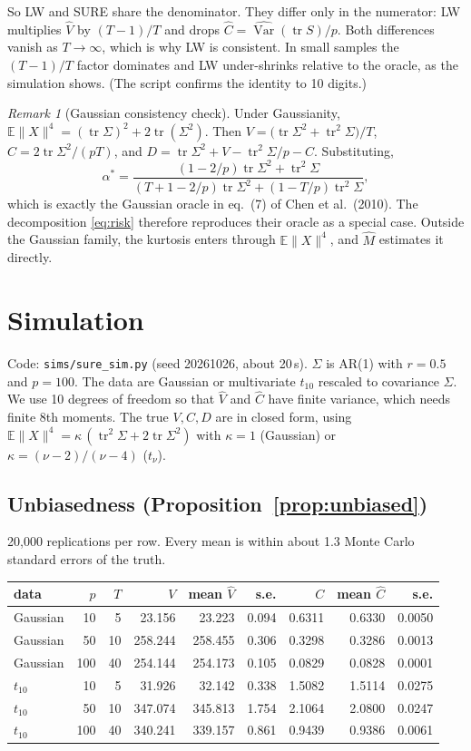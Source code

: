 \documentclass[11pt]{article}
\theoremstyle{remark}\newtheorem*{remark}{Remark}
\newcommand{\E}{\mathbb{E}}
\newcommand{\Var}{\operatorname{Var}}
\newcommand{\tr}{\operatorname{tr}}
\begin{document}
So LW and SURE share the denominator. They differ only in the numerator: LW multiplies $\hat V$ by
$(T-1)/T$ and drops $\hat C=\widehat{\Var}(\tr S)/p$. Both differences vanish as $T\to\infty$, which is
why LW is consistent. In small samples the $(T-1)/T$ factor dominates and LW under-shrinks
relative to the oracle, as the simulation shows. (The script confirms the identity to 10 digits.)

\begin{remark}[Gaussian consistency check]
Under Gaussianity, $\E\|X\|^4=(\tr\Sigma)^2+2\tr(\Sigma^2)$. Then
$V=\big(\tr\Sigma^2+\tr^2\Sigma\big)/T$, $C=2\tr\Sigma^2/(pT)$, and
$D=\tr\Sigma^2+V-\tr^2\Sigma/p-C$. Substituting,
\[
\alpha^*=\frac{(1-2/p)\tr\Sigma^2+\tr^2\Sigma}{(T+1-2/p)\tr\Sigma^2+(1-T/p)\tr^2\Sigma},
\]
which is exactly the Gaussian oracle in eq.~(7) of Chen et al.\ (2010). The decomposition
\eqref{eq:risk} therefore reproduces their oracle as a special case. Outside the Gaussian family,
the kurtosis enters through $\E\|X\|^4$, and $\hat M$ estimates it directly.
\end{remark}

\section{Simulation}
Code: \texttt{sims/sure\_sim.py} (seed 20261026, about 20\,s). $\Sigma$ is AR(1) with $r=0.5$ and $p=100$.
The data are Gaussian or multivariate $t_{10}$ rescaled to covariance $\Sigma$. We use 10 degrees of
freedom so that $\hat V$ and $\hat C$ have finite variance, which needs finite 8th moments.
The true $V,C,D$ are in closed form, using $\E\|X\|^4=\kappa\,(\tr^2\Sigma+2\tr\Sigma^2)$ with
$\kappa=1$ (Gaussian) or $\kappa=(\nu-2)/(\nu-4)$ ($t_\nu$).

\subsection*{Unbiasedness (Proposition~\ref{prop:unbiased})}
20{,}000 replications per row. Every mean is within about 1.3 Monte Carlo standard errors of the truth.

\begin{center}\small
\begin{tabular}{lrrrrrrrr}
\toprule
data & $p$ & $T$ & $V$ & mean $\hat V$ & s.e. & $C$ & mean $\hat C$ & s.e.\\
\midrule
Gaussian & 10 & 5 & 23.156 & 23.223 & 0.094 & 0.6311 & 0.6330 & 0.0050\\
Gaussian & 50 & 10 & 258.244 & 258.455 & 0.306 & 0.3298 & 0.3286 & 0.0013\\
Gaussian & 100 & 40 & 254.144 & 254.173 & 0.105 & 0.0829 & 0.0828 & 0.0001\\
$t_{10}$ & 10 & 5 & 31.926 & 32.142 & 0.338 & 1.5082 & 1.5114 & 0.0275\\
$t_{10}$ & 50 & 10 & 347.074 & 345.813 & 1.754 & 2.1064 & 2.0800 & 0.0247\\
$t_{10}$ & 100 & 40 & 340.241 & 339.157 & 0.861 & 0.9439 & 0.9386 & 0.0061\\
\bottomrule
\end{tabular}
\end{center}
\end{document}
